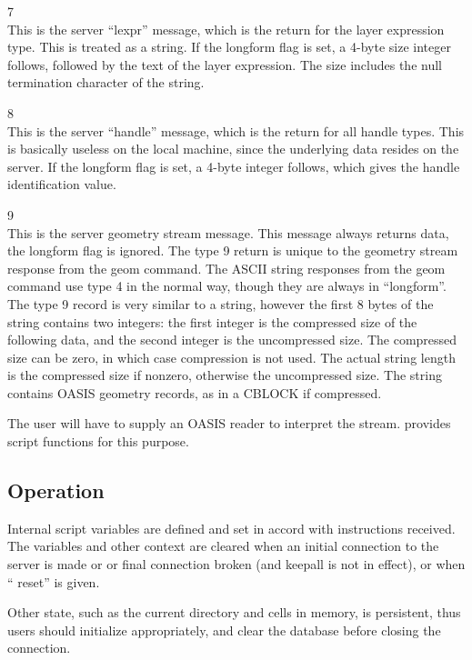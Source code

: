 \begin{description}
\item{7}\\
This is the server ``lexpr'' message, which is the return for the
layer expression type.  This is treated as a string.  If the longform
flag is set, a 4-byte size integer follows, followed by the text of
the layer expression.  The size includes the null termination
character of the string.

\item{8}\\
This is the server ``handle'' message, which is the return for all
handle types.  This is basically useless on the local machine, since
the underlying data resides on the server.  If the longform flag is
set, a 4-byte integer follows, which gives the handle identification
value.

\item{9}\\
This is the server geometry stream message.  This message always
returns data, the longform flag is ignored.  The type 9 return is
unique to the geometry stream response from the {\vt geom} command. 
The ASCII string responses from the {\vt geom} command use type 4 in
the normal way, though they are always in ``longform''.  The type 9
record is very similar to a string, however the first 8 bytes of the
string contains two integers:  the first integer is the compressed
size of the following data, and the second integer is the uncompressed
size.  The compressed size can be zero, in which case compression is
not used.  The actual string length is the compressed size if nonzero,
otherwise the uncompressed size.  The string contains OASIS geometry
records, as in a CBLOCK if compressed.

The user will have to supply an OASIS reader to interpret the stream. 
{\Xic} provides script functions for this purpose.
\end{description}

\subsection{Operation}

Internal script variables are defined and set in accord with
instructions received.  The variables and other context are cleared
when an initial connection to the server is made or or final
connection broken (and {\vt keepall} is not in effect), or when ``{\vt
reset}'' is given.

Other state, such as the current directory and cells in {\Xic} memory,
is persistent, thus users should initialize {\Xic} appropriately, and
clear the database before closing the connection.

